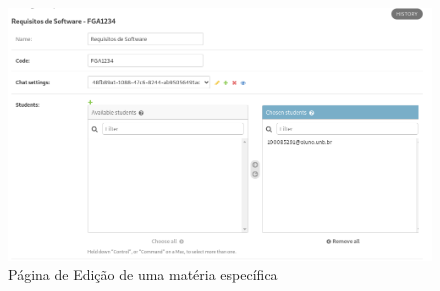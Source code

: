 \begin{figure}[H]
    \centering
    \includegraphics[width=1\textwidth]{figuras/admin4.png}
    \caption{Página de Edição de uma matéria específica}
    \label{fig:report_questions}
\end{figure}